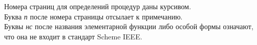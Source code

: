 \documentclass[twoside]{book}%
\begin{document}
\noindent
Номера страниц для определений процедур даны курсивом.\\
Буква {\it п} после номера страницы отсылает к примечанию.\\
Буквы {\it нс} после названия элементарной функции либо особой формы
означают, что она не входит в стандарт Scheme IEEE.\\
\begin{raggedright}
\begin{multicols}{2}
\begin{theindex}
\sloppy

\end{theindex}
\end{multicols}
\end{raggedright}
\end{document}

